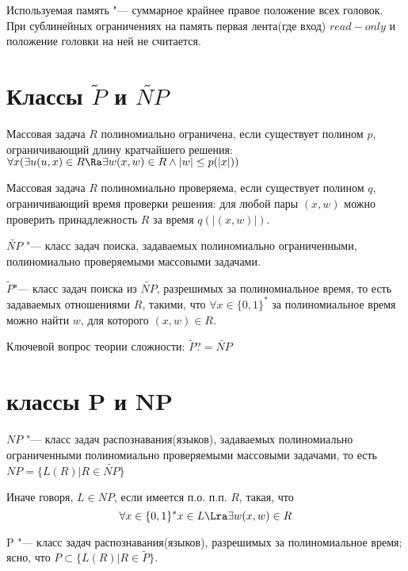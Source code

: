 \begin{Def}
Используемая память "--- суммарное крайнее 
правое положение всех головок. При сублинейных ограничениях 
на память первая лента(где вход) $read-only$ и положение 
головки на ней не считается. 
\end{Def}
\section{Классы $\tilde P$ и $\tilde {NP}$}
\begin{Def}
Массовая задача $R$ полиномиально ограничена, если 
существует полином $p$, ограничивающий длину
кратчайшего решения:
$\forall x(\exists u(u, x) \in R \Ra 
\exists w(x, w)\in R \wedge |w| \le p(|x|))$
\end{Def}
\begin{Def}
Массовая задача $R$ полиномиально проверяема, если 
существует полином $q$, ограничивающий время проверки решения:
для любой пары $(x, w)$ можно проверить принадлежность $R$
за время $q(|(x, w)|)$.
\end{Def}
\begin{Def}
$\tilde {NP}$ "--- класс задач поиска, задаваемых полиномиально 
ограниченными, полиномиально проверяемыми массовыми задачами. 
\end{Def}
\begin{Def}
$\tilde P$"--- класс задач поиска из $\tilde {NP}$, 
разрешимых за полиномиальное время, то есть задаваемых
отношениями $R$, такими, что $\forall x \in \{0, 1\}^*$ за
полиномиальное время можно найти $w$, для которого $(x,w) \in R$.
\end{Def}

\begin{Rem}
Ключевой вопрос теории сложности: $\tilde P ?= \tilde {NP}$
\end{Rem}

\section{классы P и NP}
\begin{Def}
$NP$ "--- класс задач распознавания(языков), 
задаваемых полиномиально ограниченными полиномиально 
проверяемыми массовыми задачами, то есть $NP = \{L(R)| R \in \tilde{NP}\}$

Иначе говоря, $L \in NP$, если имеется п.о. п.п. $R$, такая, что 
$$\forall x \in \{0, 1\}^* x\in L \Lra \exists w (x, w) \in R$$
\end{Def}

\begin{Def}
P "--- класс задач распознавания(языков), разрешимых за
полиномиальное время; ясно, что $P \subset \{L(R)|R \in \tilde{P}\}$.\\
\end{Def}

